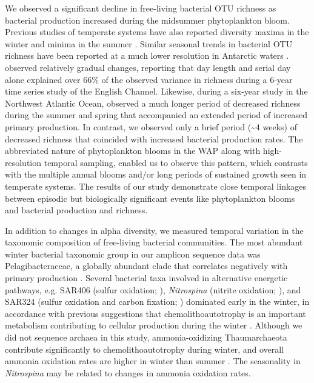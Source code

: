 We observed a significant decline in free-living bacterial OTU richness as bacterial production increased during the midsummer phytoplankton bloom. Previous studies of temperate systems have also reported diversity maxima in the winter and minima in the summer \citep{Gilbert2012-ta, Ladau2013-ro}. Similar seasonal trends in bacterial OTU richness have been reported at a much lower resolution in Antarctic waters \citep{Ghiglione2012-qm,Georges2014-ng,grwddecm12,Luria2014-dj}. \citet{Gilbert2012-ta} observed relatively gradual changes, reporting that day length and serial day alone explained over 66\% of the observed variance in richness during a 6-year time series study of the English Channel. Likewise, during a six-year study in the Northwest Atlantic Ocean, \citet{El-Swais2015-yx} observed a much longer period of decreased richness during the summer and spring that accompanied an extended period of increased primary production. In contrast, we observed only a brief period (\textasciitilde{}4 weeks) of decreased richness that coincided with increased bacterial production rates. The abbreviated nature of phytoplankton blooms in the WAP along with high-resolution temporal sampling, enabled us to observe this pattern, which contrasts with the multiple annual blooms and/or long periods of sustained growth seen in temperate systems. The results of our study demonstrate close temporal linkages between episodic but biologically significant events like phytoplankton blooms and bacterial production and richness. 

In addition to changes in alpha diversity, we measured temporal variation in the taxonomic composition of free-living bacterial communities. The most abundant winter bacterial taxonomic group in our amplicon sequence data was Pelagibacteraceae, a globally abundant clade that correlates negatively with primary production \citep{Morris2002-xb,Sowell2009-oc}. Several bacterial taxa involved in alternative energetic pathways, e.g. SAR406 (sulfur oxidation; \citealt{wright2014genomic}), \textit{Nitrospina} (nitrite oxidation; \citealt{Spieck2014-sp}), and SAR324 (sulfur oxidation and carbon fixation; \citealt{Sheik2014-yg}) dominated early in the winter, in accordance with previous suggestions that chemolithoautotrophy is an important metabolism contributing to cellular production during the winter \citep{grwddecm12,williams2012metaproteomic,manganelli2009major}. Although we did not sequence archaea in this study, ammonia-oxidizing Thaumarchaeota contribute significantly to chemolithoautotrophy during winter, and overall ammonia oxidation rates are higher in winter than summer \citep{tolar2016contribution}. The seasonality in \textit{Nitrospina} may be related to changes in ammonia oxidation rates. 


